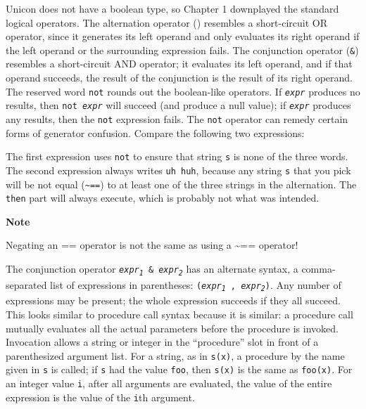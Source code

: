 Unicon does not have a boolean type, so
Chapter 1 downplayed the standard logical operators. The
alternation operator
(\texttt{{\textbar}}) resembles a short-circuit OR
operator, since it generates its left operand and only evaluates its
right operand if the left operand or the surrounding expression fails.
The conjunction operator (\texttt{\&}) resembles a short-circuit
AND operator; it evaluates its left operand,
and if that operand succeeds, the result of the conjunction is the
result of its right operand. The reserved word \texttt{not} rounds out
the boolean-like operators. If \texttt{\textit{expr}} produces no
results, then \texttt{not }\texttt{\textit{expr}} will
succeed (and produce a null value); if \texttt{\textit{expr}} produces
any results, then the \texttt{not} expression fails. The \texttt{not}
operator can remedy certain forms of generator confusion. Compare the
following two expressions:


The first expression uses \texttt{not} to ensure that string \texttt{s}
is none of the three words. The second expression always writes
\texttt{{\textquotedbl}uh huh{\textquotedbl}}, because any string
\texttt{s} that you pick will be not equal (\texttt{\~{}==}) to at
least one of the three strings in the alternation. The \texttt{then}
part will always execute, which is probably not what was intended.

{\sffamily\bfseries Note}

{\sffamily
Negating an == operator is not the same as using a \~{}== operator!}

The conjunction operator
\texttt{\textit{expr}}\texttt{\textit{\textsubscript{1}}}\texttt{ \&
}\texttt{\textit{expr}}\texttt{\textit{\textsubscript{2}}} has an
alternate syntax, a comma-separated list of expressions in parentheses:
\texttt{(}\texttt{\textit{expr}}\texttt{\textit{\textsubscript{1}}}\texttt{
, }\texttt{\textit{expr}}\texttt{\textit{\textsubscript{2}}}\texttt{)}.
Any number of expressions may be present; the whole expression
succeeds if they all succeed. This looks similar to procedure call syntax
because it is similar: a procedure call mutually
evaluates all the actual parameters before the procedure is invoked.
Invocation allows a string or integer in the ``procedure'' slot
in front of a parenthesized argument
list. For a string, as in
\texttt{s(x)}, a procedure by the name given in \texttt{s} is called;
if \texttt{s} had the value \texttt{{\textquotedbl}foo{\textquotedbl}},
then \texttt{s(x)} is the same as \texttt{foo(x)}. For an integer value
\texttt{i}, after all arguments are evaluated, the value of the entire
expression is the value of the \texttt{i}{\textquotesingle}th argument.

